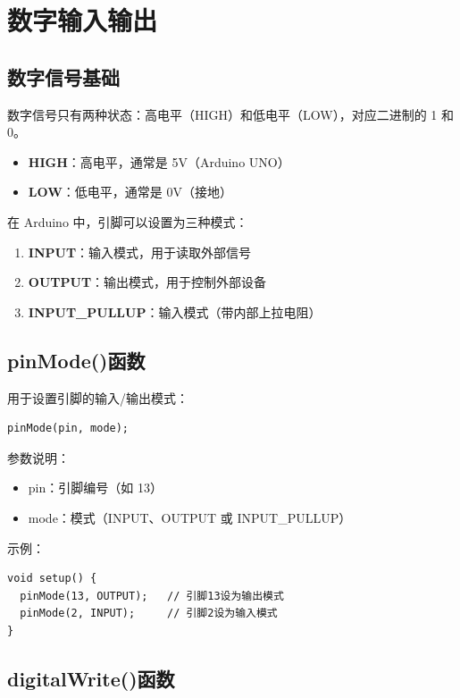 \documentclass[12pt,UTF8]{ctexbook}
\begin{document}
\chapter{数字输入输出}

\section{数字信号基础}

数字信号只有两种状态：高电平（HIGH）和低电平（LOW），对应二进制的 1 和 0。

\begin{itemize}
    \item \textbf{HIGH}：高电平，通常是 5V（Arduino UNO）
    \item \textbf{LOW}：低电平，通常是 0V（接地）
\end{itemize}

在 Arduino 中，引脚可以设置为三种模式：
\begin{enumerate}
    \item \textbf{INPUT}：输入模式，用于读取外部信号
    \item \textbf{OUTPUT}：输出模式，用于控制外部设备
    \item \textbf{INPUT_PULLUP}：输入模式（带内部上拉电阻）
\end{enumerate}

\section{pinMode()函数}

用于设置引脚的输入/输出模式：

\begin{lstlisting}
pinMode(pin, mode);
\end{lstlisting}

参数说明：
\begin{itemize}
    \item pin：引脚编号（如 13）
    \item mode：模式（INPUT、OUTPUT 或 INPUT_PULLUP）
\end{itemize}

示例：
\begin{lstlisting}
void setup() {
  pinMode(13, OUTPUT);   // 引脚13设为输出模式
  pinMode(2, INPUT);     // 引脚2设为输入模式
}
\end{lstlisting}

\section{digitalWrite()函数}
\end{document}
